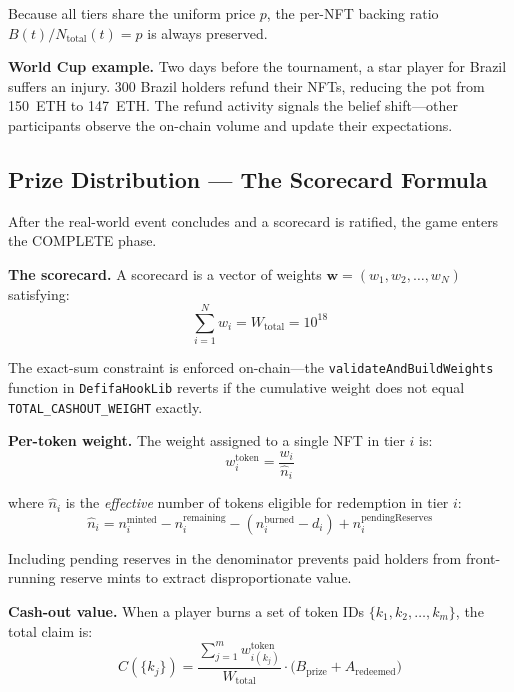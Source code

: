 \documentclass[11pt,a4paper]{article}
\begin{document}
Because all tiers share the uniform price $p$, the per-NFT backing ratio $B(t) / N_{\text{total}}(t) = p$ is always preserved.

\textbf{World Cup example.} Two days before the tournament, a star player for Brazil suffers an injury. 300 Brazil holders refund their NFTs, reducing the pot from 150~ETH to 147~ETH. The refund activity signals the belief shift---other participants observe the on-chain volume and update their expectations.

\subsection{Prize Distribution --- The Scorecard Formula}

After the real-world event concludes and a scorecard is ratified, the game enters the COMPLETE phase.

\textbf{The scorecard.} A scorecard is a vector of weights $\mathbf{w} = (w_1, w_2, \ldots, w_N)$ satisfying:
\begin{equation}
\sum_{i=1}^{N} w_i = W_{\text{total}} = 10^{18}
\end{equation}

The exact-sum constraint is enforced on-chain---the \texttt{validateAndBuildWeights} function in \texttt{DefifaHookLib} reverts if the cumulative weight does not equal \texttt{TOTAL\_CASHOUT\_WEIGHT} exactly.

\textbf{Per-token weight.} The weight assigned to a single NFT in tier $i$ is:
\begin{equation}
w_i^{\text{token}} = \frac{w_i}{\hat{n}_i}
\end{equation}

where $\hat{n}_i$ is the \emph{effective} number of tokens eligible for redemption in tier $i$:
\begin{equation}
\hat{n}_i = n_i^{\text{minted}} - n_i^{\text{remaining}} - (n_i^{\text{burned}} - d_i) + n_i^{\text{pendingReserves}}
\end{equation}

Including pending reserves in the denominator prevents paid holders from front-running reserve mints to extract disproportionate value.

\textbf{Cash-out value.} When a player burns a set of token IDs $\{k_1, k_2, \ldots, k_m\}$, the total claim is:
\begin{equation}
\boxed{C(\{k_j\}) = \frac{\displaystyle\sum_{j=1}^{m} w_{i(k_j)}^{\text{token}}}{W_{\text{total}}} \cdot \bigl(B_{\text{prize}} + A_{\text{redeemed}}\bigr)}
\label{eq:cashout}
\end{equation}
\end{document}

